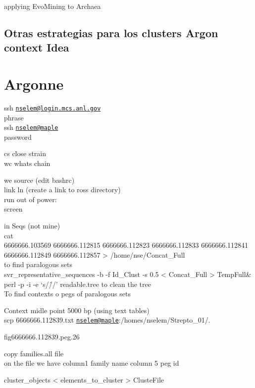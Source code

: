 \documentclass[12pt,twoside]{reedthesis}
\begin{document}
  applying EvoMining to Archaea
  
  \subsection{Otras estrategias para los clusters Argon context
  Idea}\label{otras-estrategias-para-los-clusters-argon-context-idea}
  
  \section{Argonne}\label{argonne}
  
  ssh
  \href{mailto:nselem@login.mcs.anl.gov}{\nolinkurl{nselem@login.mcs.anl.gov}}\\
  phrase\\
  ssh \href{mailto:nselem@maple}{\nolinkurl{nselem@maple}}\\
  password
  
  cs close strain\\
  wc whats chain
  
  we source (edit bashrc)\\
  link ln (create a link to ross directory)\\
  run out of power:\\
  screen
  
  in Seqs (not mine)\\
  cat\\
  6666666.103569 6666666.112815 6666666.112823 6666666.112833
  6666666.112841 6666666.112849 6666666.112857 \textgreater{}
  /home/nse/Concat\_Full\\
  to find paralogous sets\\
  svr\_representative\_sequences -b -f Id\_Clust -s 0.5 \textless{}
  Concat\_Full \textgreater{} TempFull\&\\
  perl -p -i -e `s/\r//' readable.tree to clean the tree\\
  To find contexts o pegs of paralogous sets
  
  Context midle point 5000 bp (using text tables)\\
  scp 6666666.112839.txt
  \href{mailto:nselem@maple}{\nolinkurl{nselem@maple}}:/homes/nselem/Strepto\_01/.
  
  fig\textbar{}6666666.112839.peg.26
  
  copy families.all file\\
  on the file we have column1 family name column 5 peg id
  
  cluster\_objects \textless{} elements\_to\_cluster \textgreater{}
  ClusteFile
  
\end{document}
